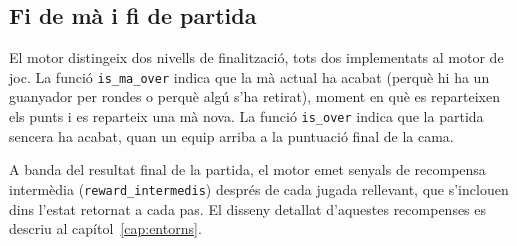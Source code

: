 \subsection*{Fi de mà i fi de partida}

El motor distingeix dos nivells de finalització, tots dos implementats al motor de joc. La funció \texttt{is\_ma\_over} indica que la mà actual
ha acabat (perquè hi ha un guanyador per rondes o perquè algú s'ha retirat),
moment en què es reparteixen els punts i es reparteix una mà nova. La funció
\texttt{is\_over} indica que la partida sencera ha acabat, quan un equip arriba
a la puntuació final de la cama.

A banda del resultat final de la partida, el motor emet senyals de recompensa
intermèdia (\texttt{reward\_intermedis}) després de cada jugada rellevant, que
s'inclouen dins l'estat retornat a cada pas. El disseny detallat d'aquestes
recompenses es descriu al capítol~\ref{cap:entorns}.
